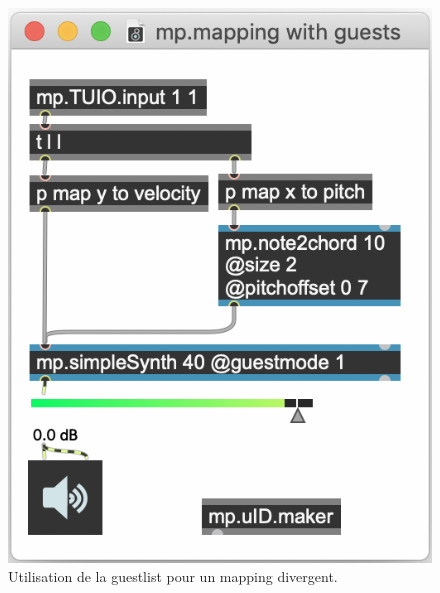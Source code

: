 \begin{figure}[!htbp]
	\captionsetup{format=plain}%
	\centering
	\begin{minipage}[t]{0.38\textwidth}
		\includegraphics[width=\linewidth]{gfx/04_algorithms/MP-mappingGuest.png}
		\caption[Exemple de patch MP : guestlist]{Utilisation de la guestlist pour un mapping divergent.}
		\label{fig:algorithms:MP-mappingDivergent}
	\end{minipage}
	\hspace{.01\linewidth}
	\begin{minipage}[t]{0.58\textwidth}

\end{minipage}
\end{figure}
